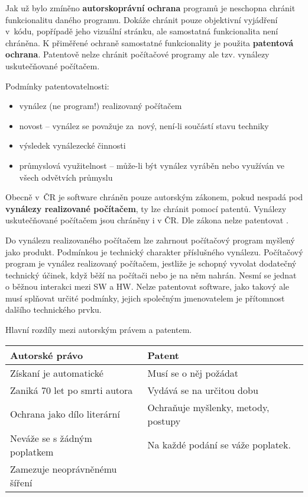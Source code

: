Jak už bylo zmíněno \textbf{autorskoprávní ochrana} programů je neschopna chránit funkcionalitu daného programu. Dokáže chránit pouze objektivní vyjádření v~kódu, popřípadě jeho vizuální stránku, ale samostatná funkcionalita není chráněna. K přiměřené ochraně samostatné funkcionality je použita \textbf{patentová ochrana}. Patentově nelze chránit počítačové programy ale tzv. vynálezy uskutečňované počítačem.
\newline

\noindent Podmínky patentovatelnosti:
\begin{itemize}[noitemsep]
    \item vynález (ne program!) realizovaný počítačem
    \item novost -- vynález se považuje za~nový, není-li součástí stavu techniky
    \item výsledek vynálezecké činnosti
    \item průmyslová využitelnost -- může-li být vynález vyráběn nebo využíván ve všech odvětvích průmyslu
\end{itemize}
Obecně v~ČR je software chráněn pouze autorským zákonem, pokud nespadá pod \textbf{vynálezy realizované počítačem}, ty lze chránit pomocí patentů.  
Vynálezy uskutečňované počítačem jsou chráněny i v ČR. Dle zákona nelze patentovat .

Do vynálezu realizovaného počítačem lze zahrnout počítačový program myšlený jako produkt. Podmínkou je technický charakter příslušného vynálezu. Počítačový program je vynález realizovaný počítačem, jestliže je schopný vyvolat dodatečný technický účinek, když běží na počítači nebo je na něm nahrán. Nesmí se jednat o běžnou interakci mezi SW a HW. Nelze patentovat software, jako takový ale musí splňovat určité podmínky, jejich společným jmenovatelem je přítomnost dalšího technického prvku. 

Hlavní rozdíly mezi autorským právem a patentem.

\begin{center}
    \begin{tabular}{|l|l|}
    \hline
        Autorské právo & Patent \\\hline
        Získaní je automatické & Musí se o něj požádat\\\hline
        Zaniká 70 let po smrti autora & Vydává se na určitou dobu\\\hline
        Ochrana jako dílo literární & Ochraňuje myšlenky, metody, postupy\\\hline
        Neváže se s žádným poplatkem & Na každé podání se váže poplatek.\\\hline
        Zamezuje neoprávněnému šíření & \\\hline
    \end{tabular}
\end{center}









